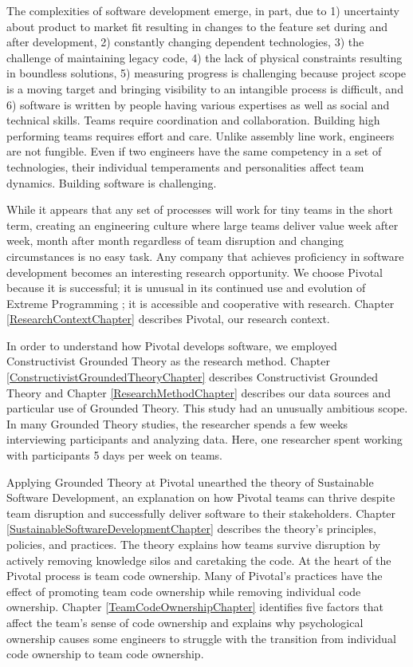 The complexities of software development emerge, in part, due to 1) uncertainty about product to market fit resulting in changes to the feature set during and after development, 2) constantly changing dependent technologies, 3) the challenge of maintaining legacy code, 4) the lack of physical constraints resulting in boundless solutions, 5) measuring progress is challenging because project scope is a moving target and bringing visibility to an intangible process is difficult, and 6) software is written by people having various expertises as well as social and technical skills. Teams require coordination and collaboration. Building high performing teams requires effort and care. Unlike assembly line work, engineers are not fungible. Even if two engineers have the same competency in a set of technologies, their individual temperaments and personalities affect team dynamics. Building software is challenging. 


While it appears that any set of processes will work for tiny teams in the short term, creating an engineering culture where large teams deliver value week after week, month after month regardless of team disruption and changing circumstances is no easy task. Any company that achieves proficiency in software development becomes an interesting research opportunity. We choose Pivotal because it is successful; it is unusual in its continued use and evolution of Extreme Programming \cite{BeckExtremeProgramming2004};  it is accessible and cooperative with research. Chapter \ref{ResearchContextChapter} describes Pivotal, our research context. 


In order to understand how Pivotal develops software, we employed Constructivist Grounded Theory as the research method. Chapter \ref{ConstructivistGroundedTheoryChapter} describes Constructivist Grounded Theory and Chapter \ref{ResearchMethodChapter} describes our data sources and particular use of Grounded Theory. This study had an unusually ambitious scope. In many Grounded Theory studies, the researcher spends a few weeks interviewing participants and analyzing data. Here, one researcher spent \durationOfResearchStudyPlural{} working with participants 5 days per week on \numberOfObservedProjects{} teams. 


Applying Grounded Theory at Pivotal unearthed the theory of Sustainable Software Development, an explanation on how Pivotal teams can thrive despite team disruption and successfully deliver software to their stakeholders. Chapter \ref{SustainableSoftwareDevelopmentChapter} describes the theory's principles, policies, and practices. The theory explains how teams survive disruption by actively removing knowledge silos and caretaking the code. At the heart of the Pivotal process is team code ownership. Many of Pivotal's practices have the effect of promoting team code ownership while removing individual code ownership. Chapter \ref{TeamCodeOwnershipChapter} identifies five factors that affect the team's sense of code ownership and explains why psychological ownership causes some engineers to struggle with the transition from individual code ownership to team code ownership. 



